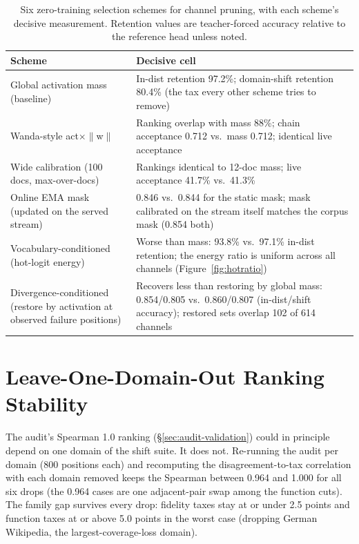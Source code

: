 \documentclass{article}
\begin{document}
\begin{table}[h]
\caption{Six zero-training selection schemes for channel pruning, with each scheme's decisive measurement. Retention values are teacher-forced accuracy relative to the reference head unless noted.}
\label{tab:schemes}
\vskip 0.1in
\centering
\small
\begin{tabular}{p{2.5cm}p{4.7cm}}
\toprule
Scheme & Decisive cell \\
\midrule
Global activation mass (baseline) & In-dist retention 97.2\%; domain-shift retention 80.4\% (the tax every other scheme tries to remove) \\
\addlinespace
Wanda-style act$\times$$\|$w$\|$ & Ranking overlap with mass 88\%; chain acceptance 0.712 vs.\ mass 0.712; identical live acceptance \\
\addlinespace
Wide calibration (100 docs, max-over-docs) & Rankings identical to 12-doc mass; live acceptance 41.7\% vs.\ 41.3\% \\
\addlinespace
Online EMA mask (updated on the served stream) & 0.846 vs.\ 0.844 for the static mask; mask calibrated on the stream itself matches the corpus mask (0.854 both) \\
\addlinespace
Vocabulary-conditioned (hot-logit energy) & Worse than mass: 93.8\% vs.\ 97.1\% in-dist retention; the energy ratio is uniform across all channels (Figure~\ref{fig:hotratio}) \\
\addlinespace
Divergence-conditioned (restore by activation at observed failure positions) & Recovers less than restoring by global mass: 0.854/0.805 vs.\ 0.860/0.807 (in-dist/shift accuracy); restored sets overlap 102 of 614 channels \\
\bottomrule
\end{tabular}
\end{table}

\section{Leave-One-Domain-Out Ranking Stability}
\label{app:lodo}

The audit's Spearman 1.0 ranking (\S\ref{sec:audit-validation}) could in principle depend on one domain of the shift suite. It does not. Re-running the audit per domain (800 positions each) and recomputing the disagreement-to-tax correlation with each domain removed keeps the Spearman between 0.964 and 1.000 for all six drops (the 0.964 cases are one adjacent-pair swap among the function cuts). The family gap survives every drop: fidelity taxes stay at or under 2.5 points and function taxes at or above 5.0 points in the worst case (dropping German Wikipedia, the largest-coverage-loss domain).
\end{document}
